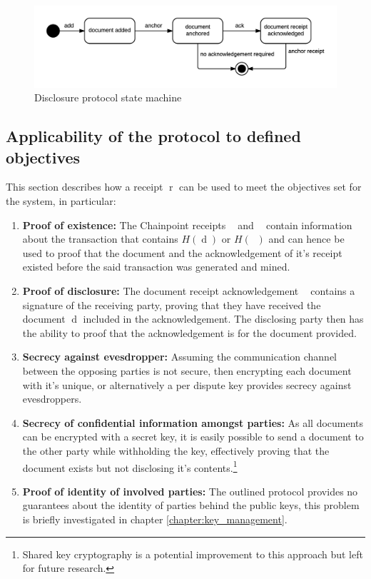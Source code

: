 \documentclass[12pt,msc,a4paper,oneside]{ucl_thesis}
\DeclareMathOperator{\receipt}{r}
\DeclareMathOperator{\doc}{d}
\DeclareMathOperator{\docack}{d^*}
\DeclareMathOperator{\docreceipt}{\receipt_{\doc}}
\DeclareMathOperator{\docackreceipt}{\receipt_{\docack}}
\begin{document}
\begin{figure}
    \includegraphics[width=1.0\textwidth]{./figures/disclosure_protocol.png}
    \caption{Disclosure protocol state machine}
    \label{fig:disclosure_state_machine}
\end{figure}

\subsection{Applicability of the protocol to defined objectives}
This section describes how a receipt $\receipt$ can be used to meet the objectives set for the system, in particular:
\begin{enumerate}
    \item{\textbf{Proof of existence:}} The Chainpoint receipts $\docreceipt$ and $\docackreceipt$ contain information about the transaction that contains $H(\doc)$ or $H(\docack)$ and can hence be used to proof that the document and the acknowledgement of it's receipt existed before the said transaction was generated and mined.
    \item{\textbf{Proof of disclosure:}} The document receipt acknowledgement $\docack$ contains a signature of the receiving party, proving that they have received the document $\doc$ included in the acknowledgement. The disclosing party then has the ability to proof that the acknowledgement is for the document provided.
    \item{\textbf{Secrecy against evesdropper:}} Assuming the communication channel between the opposing parties is not secure, then encrypting each document with it's unique, or alternatively a per dispute key provides secrecy against evesdroppers.
    \item{\textbf{Secrecy of confidential information amongst parties:}} As all documents can be encrypted with a secret key, it is easily possible to send a document to the other party while withholding the key, effectively proving that the document exists but not disclosing it's contents.\footnote{Shared key cryptography is a potential improvement to this approach but left for future research.}
    \item{\textbf{Proof of identity of involved parties:}} The outlined protocol provides no guarantees about the identity of parties behind the public keys, this problem is briefly investigated in chapter \ref{chapter:key_management}.
\end{enumerate}
\end{document}

